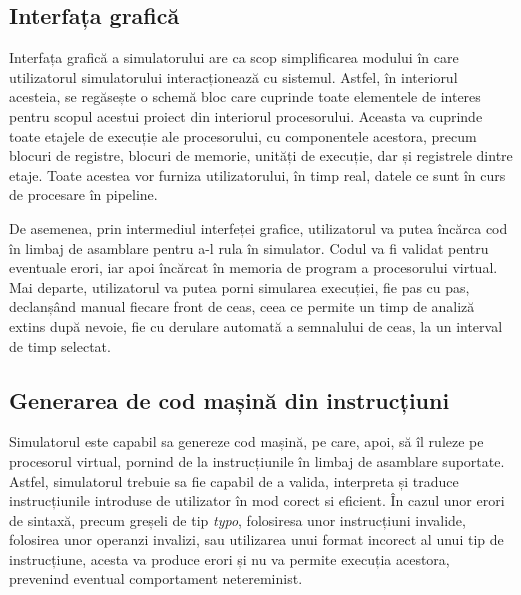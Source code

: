 \documentclass{article}
\begin{document}
\subsection{Interfața grafică}
\label{subsec:ui}
Interfața grafică a simulatorului are ca scop simplificarea modului în care utilizatorul simulatorului interacționează cu sistemul. Astfel, în interiorul acesteia, se regăsește o schemă bloc care cuprinde toate elementele de interes pentru scopul acestui proiect din interiorul procesorului. Aceasta va cuprinde toate etajele de execuție ale procesorului, cu componentele acestora, precum blocuri de registre, blocuri de memorie, unități de execuție, dar și registrele dintre etaje. Toate acestea vor furniza utilizatorului, în timp real, datele ce sunt în curs de procesare în pipeline.

De asemenea, prin intermediul interfeței grafice, utilizatorul va putea încărca cod în limbaj de asamblare pentru a-l rula în simulator. Codul va fi validat pentru eventuale erori, iar apoi încărcat în memoria de program a procesorului virtual. Mai departe, utilizatorul va putea porni simularea execuției, fie pas cu pas, declanșând manual fiecare front de ceas, ceea ce permite un timp de analiză extins după nevoie, fie cu derulare automată a semnalului de ceas, la un interval de timp selectat.

\subsection{Generarea de cod mașină din instrucțiuni}
Simulatorul este capabil sa genereze cod mașină, pe care, apoi, să îl ruleze pe procesorul virtual, pornind de la instrucțiunile în limbaj de asamblare suportate. Astfel, simulatorul trebuie sa fie capabil de a valida, interpreta și traduce instrucțiunile introduse de utilizator în mod corect si eficient. În cazul unor erori de sintaxă, precum greșeli de tip \textit{typo}, folosiresa unor instrucțiuni invalide, folosirea unor operanzi invalizi, sau utilizarea unui format incorect al unui tip de instrucțiune, acesta va produce erori și nu va permite execuția acestora, prevenind eventual comportament netereminist.
\end{document}
